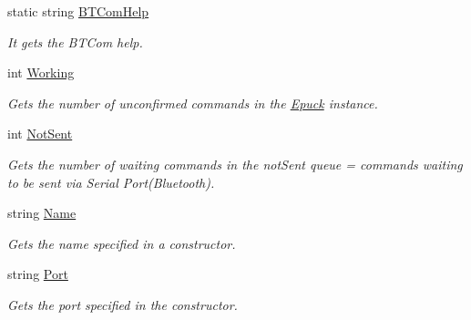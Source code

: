   \begin{DoxyCompactItemize}
  \item 
  static string \hyperlink{class_elib_1_1_epuck_a0c2ac9894699214d11d34393f4c37681}{BTComHelp}
  \begin{DoxyCompactList}\small\item\em It gets the BTCom help. \item\end{DoxyCompactList}\item 
  int \hyperlink{class_elib_1_1_epuck_af2dd18800c02f63e0c567abede754c1c}{Working}
  \begin{DoxyCompactList}\small\item\em Gets the number of unconfirmed commands in the \hyperlink{class_elib_1_1_epuck}{Epuck} instance. \item\end{DoxyCompactList}
  \item 
int \hyperlink{class_elib_1_1_epuck_a5e19ebf6190d7c3850cb5551a91e261f}{NotSent}
\begin{DoxyCompactList}\small\item\em Gets the number of waiting commands in the notSent queue = commands waiting to be sent via Serial Port(Bluetooth). \item\end{DoxyCompactList}\item 
string \hyperlink{class_elib_1_1_epuck_a33c661ddaae53d658ea4f36de2e0f835}{Name}
\begin{DoxyCompactList}\small\item\em Gets the name specified in a constructor. \item\end{DoxyCompactList}\item 
string \hyperlink{class_elib_1_1_epuck_ac267eba98589b346ef38a5ce942eff95}{Port}
\begin{DoxyCompactList}\small\item\em Gets the port specified in the constructor. \item\end{DoxyCompactList}\item 

\end{DoxyCompactItemize}
